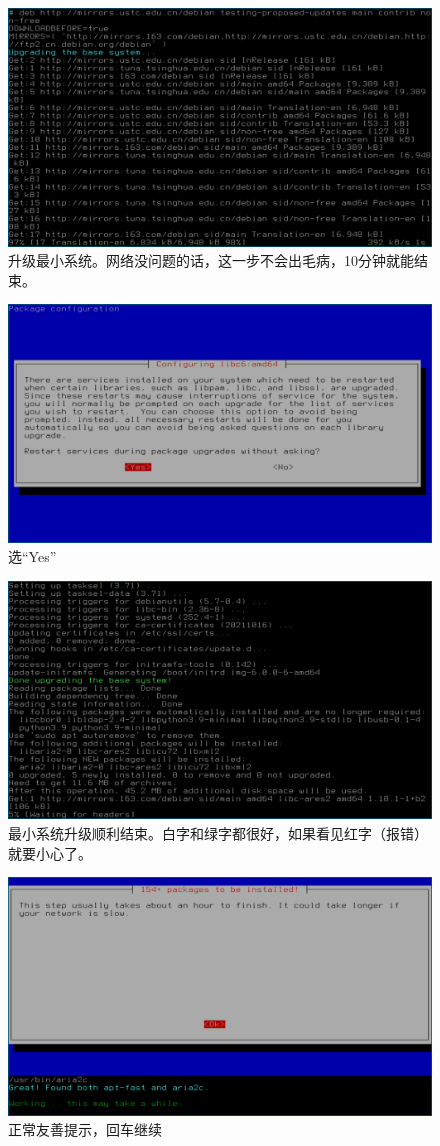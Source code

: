 \documentclass{wx672ctexart} \usepackage{hyperref}
\begin{document}
\begin{enumerate}
\begin{figure}[htbp]
\centering
\includegraphics[width=.5\linewidth]{screenshots/40.png}
\caption{升级最小系统。网络没问题的话，这一步不会出毛病，10分钟就能结束。}
\end{figure}

\begin{figure}[htbp]
\centering
\includegraphics[width=.5\linewidth]{screenshots/41.png}
\caption{选“Yes”}
\end{figure}

\begin{figure}[htbp]
\centering
\includegraphics[width=.5\linewidth]{screenshots/43.png}
\caption{最小系统升级顺利结束。白字和绿字都很好，如果看见红字（报错）就要小心了。}
\end{figure}

\begin{figure}[htbp]
\centering
\includegraphics[width=.5\linewidth]{screenshots/44.png}
\caption{正常友善提示，回车继续}
\end{figure}


\end{enumerate}
\end{document}
